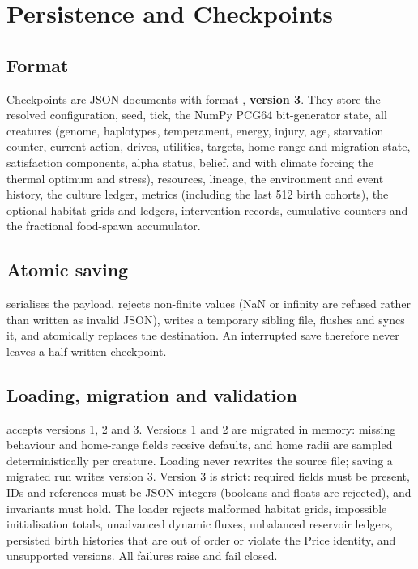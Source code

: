 \chapter{Persistence and Checkpoints}

\section{Format}
Checkpoints are JSON documents with format , \textbf{version 3}. They
store the resolved configuration, seed, tick, the NumPy PCG64 bit-generator state,
all creatures (genome, haplotypes, temperament, energy, injury, age, starvation
counter, current action, drives, utilities, targets, home-range and migration
state, satisfaction components, alpha status, belief, and with climate forcing the
thermal optimum and stress), resources, lineage, the environment and event
history, the culture ledger, metrics (including the last 512 birth cohorts), the
optional habitat grids and ledgers, intervention records, cumulative counters and
the fractional food-spawn accumulator.

\section{Atomic saving}
 serialises the payload, rejects non-finite values (NaN or
infinity are refused rather than written as invalid JSON), writes a temporary
sibling file, flushes and syncs it, and atomically replaces the destination. An
interrupted save therefore never leaves a half-written checkpoint.

\section{Loading, migration and validation}
 accepts versions 1, 2 and 3. Versions 1 and 2 are migrated
in memory: missing behaviour and home-range fields receive defaults, and
home radii are sampled deterministically per creature. Loading never rewrites the
source file; saving a migrated run writes version 3. Version 3 is strict:
required fields must be present, IDs and references must be JSON integers (booleans
and floats are rejected), and invariants must hold. The loader rejects malformed
habitat grids, impossible initialisation totals, unadvanced dynamic fluxes,
unbalanced reservoir ledgers, persisted birth histories that are out of order or
violate the Price identity, and unsupported versions. All failures raise
 and fail closed.


